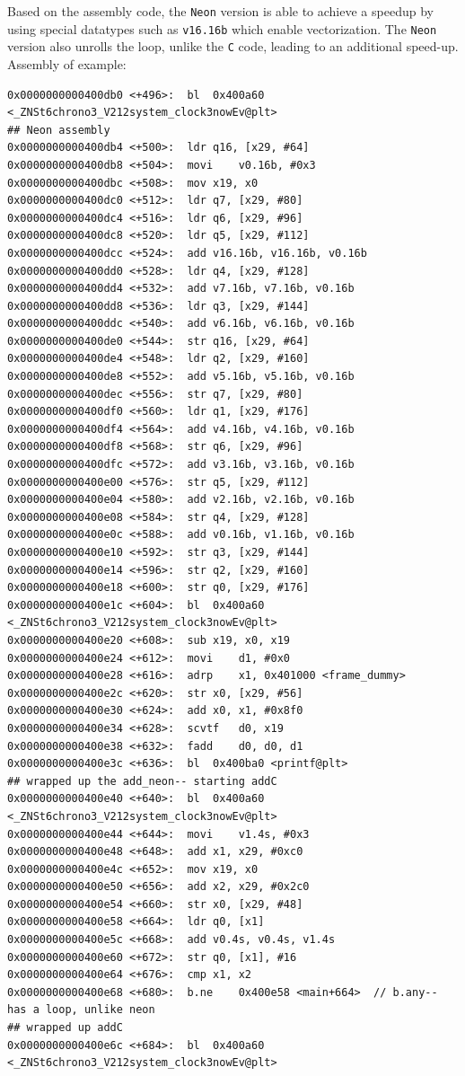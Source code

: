 \documentclass[
  course = {{ESE532 System-on-a-Chip}},
  quartile = {{}},
  assignment = 4,
  name = {{Sheil Sarda, Kate Ballard}},
  studentnumber = {{}},
  email = {{sheils@seas.upenn.edu, kballard@seas.upenn.edu}},
  firstexercise = 1
]{aga-homework}
\begin{document}
\subexercise
Based on the assembly code, the \verb|Neon| version is able to achieve a speedup by using 
special datatypes such as \verb|v16.16b| which enable vectorization. The \verb|Neon| version also unrolls the loop, unlike the \verb|C| code, leading to an additional speed-up.
Assembly of example:
\begin{verbatim}
0x0000000000400db0 <+496>:	bl	0x400a60 <_ZNSt6chrono3_V212system_clock3nowEv@plt>
## Neon assembly
0x0000000000400db4 <+500>:	ldr	q16, [x29, #64]
0x0000000000400db8 <+504>:	movi	v0.16b, #0x3
0x0000000000400dbc <+508>:	mov	x19, x0
0x0000000000400dc0 <+512>:	ldr	q7, [x29, #80]
0x0000000000400dc4 <+516>:	ldr	q6, [x29, #96]
0x0000000000400dc8 <+520>:	ldr	q5, [x29, #112]
0x0000000000400dcc <+524>:	add	v16.16b, v16.16b, v0.16b
0x0000000000400dd0 <+528>:	ldr	q4, [x29, #128]
0x0000000000400dd4 <+532>:	add	v7.16b, v7.16b, v0.16b
0x0000000000400dd8 <+536>:	ldr	q3, [x29, #144]
0x0000000000400ddc <+540>:	add	v6.16b, v6.16b, v0.16b
0x0000000000400de0 <+544>:	str	q16, [x29, #64]
0x0000000000400de4 <+548>:	ldr	q2, [x29, #160]
0x0000000000400de8 <+552>:	add	v5.16b, v5.16b, v0.16b
0x0000000000400dec <+556>:	str	q7, [x29, #80]
0x0000000000400df0 <+560>:	ldr	q1, [x29, #176]
0x0000000000400df4 <+564>:	add	v4.16b, v4.16b, v0.16b
0x0000000000400df8 <+568>:	str	q6, [x29, #96]
0x0000000000400dfc <+572>:	add	v3.16b, v3.16b, v0.16b
0x0000000000400e00 <+576>:	str	q5, [x29, #112]
0x0000000000400e04 <+580>:	add	v2.16b, v2.16b, v0.16b
0x0000000000400e08 <+584>:	str	q4, [x29, #128]
0x0000000000400e0c <+588>:	add	v0.16b, v1.16b, v0.16b
0x0000000000400e10 <+592>:	str	q3, [x29, #144]
0x0000000000400e14 <+596>:	str	q2, [x29, #160]
0x0000000000400e18 <+600>:	str	q0, [x29, #176]
0x0000000000400e1c <+604>:	bl	0x400a60 <_ZNSt6chrono3_V212system_clock3nowEv@plt>
0x0000000000400e20 <+608>:	sub	x19, x0, x19
0x0000000000400e24 <+612>:	movi	d1, #0x0
0x0000000000400e28 <+616>:	adrp	x1, 0x401000 <frame_dummy>
0x0000000000400e2c <+620>:	str	x0, [x29, #56]
0x0000000000400e30 <+624>:	add	x0, x1, #0x8f0
0x0000000000400e34 <+628>:	scvtf	d0, x19
0x0000000000400e38 <+632>:	fadd	d0, d0, d1
0x0000000000400e3c <+636>:	bl	0x400ba0 <printf@plt>
## wrapped up the add_neon-- starting addC
0x0000000000400e40 <+640>:	bl	0x400a60 <_ZNSt6chrono3_V212system_clock3nowEv@plt>
0x0000000000400e44 <+644>:	movi	v1.4s, #0x3
0x0000000000400e48 <+648>:	add	x1, x29, #0xc0
0x0000000000400e4c <+652>:	mov	x19, x0
0x0000000000400e50 <+656>:	add	x2, x29, #0x2c0
0x0000000000400e54 <+660>:	str	x0, [x29, #48]
0x0000000000400e58 <+664>:	ldr	q0, [x1]
0x0000000000400e5c <+668>:	add	v0.4s, v0.4s, v1.4s
0x0000000000400e60 <+672>:	str	q0, [x1], #16
0x0000000000400e64 <+676>:	cmp	x1, x2
0x0000000000400e68 <+680>:	b.ne	0x400e58 <main+664>  // b.any-- has a loop, unlike neon
## wrapped up addC
0x0000000000400e6c <+684>:	bl	0x400a60 <_ZNSt6chrono3_V212system_clock3nowEv@plt>
\end{verbatim}
\end{document}
